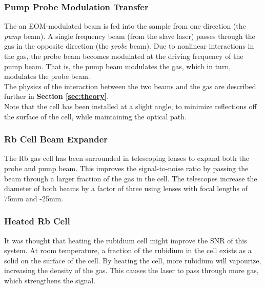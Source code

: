    \subsubsection{Pump Probe Modulation Transfer}

The an EOM-modulated beam is fed into the sample from one direction (the \emph{pump} beam).  A single frequency beam (from the slave laser) passes through the gas in the opposite direction (the \emph{probe} beam).  Due to nonlinear interactions in the gas, the probe beam becomes modulated at the driving frequency of the pump beam.  That is, the pump beam modulates the gas, which in turn, modulates the probe beam. \\

The physics of the interaction between the two beams and the gas are described further in \textbf{Section \ref{sec:theory}}. \\

Note that the cell has been installed at a slight angle, to minimize reflections off the surface of the cell, while maintaining the optical path.

    \subsubsection{Rb Cell Beam Expander}

The Rb gas cell has been surrounded in telescoping lenses to expand both the probe and pump beam.  This improves the signal-to-noise ratio by passing the beam through a larger fraction of the gas in the cell.  The telescopes increase the diameter of both beams by a factor of three using lenses with focal lengths of 75mm and -25mm.

\vfill

    \subsubsection{Heated Rb Cell}

It was thought that heating the rubidium cell might improve the SNR of this system.  At room temperature, a fraction of the rubidium in the cell exists as a solid on the surface of the cell.  By heating the cell, more rubidium will vapourize, increasing the density of the gas.  This causes the laser to pass through more gas, which strengthens the signal. \\

